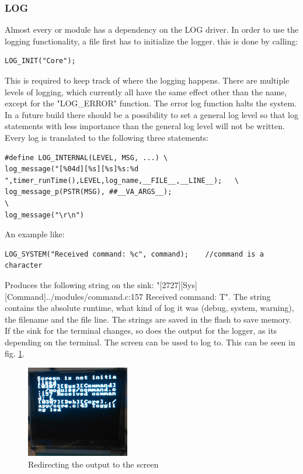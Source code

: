 \subsubsection{LOG}
Almost every  or module has a dependency on the LOG driver. In order to use the logging functionality, a file first has to initialize the logger. this is done by calling:
\begin{verbatim}
LOG_INIT("Core");
\end{verbatim}
This is required to keep track of where the logging happens. There are multiple levels of logging, which currently all have the same effect other than the name, except for the "LOG\_ERROR" function. The error log function halts the system. In a future build there should be a possibility to set a general log level so that log statements with less importance than the general log level will not be written. Every log is translated to the following three statements:
\begin{verbatim}
#define LOG_INTERNAL(LEVEL, MSG, ...) \
log_message("[%04d][%s][%s]%s:%d ",timer_runTime(),LEVEL,log_name,__FILE__,__LINE__);   \
log_message_p(PSTR(MSG), ##__VA_ARGS__);                                                        \
log_message("\r\n")
\end{verbatim}
An example like:
\begin{verbatim}
LOG_SYSTEM("Received command: %c", command);	//command is a character
\end{verbatim}
Produces the following string on the sink: "[2727][Sys][Command]../modules/command.c:157 Received command: T". The string contains the absolute runtime, what kind of log it was (debug, system, warning), the filename and the file line. The strings are saved in the flash to save memory. If the sink for the terminal changes, so does the output for the logger, as its depending on the terminal. The screen can be used to log to. This can be seen in fig. \ref{fig:screen_logger}.
\begin{figure}[H]
	\centering
	\label{fig:screen_logger}
	\includegraphics[width=0.4\textwidth]{./fig/screen_logger.png}
	\caption{Redirecting the output to the screen}
\end{figure}

